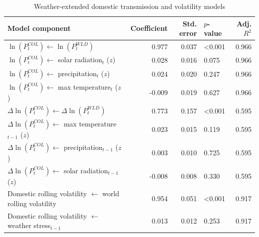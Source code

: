 \begin{table}
\caption{Weather-extended domestic transmission and volatility models}
\label{tab:weather_extended_models}
\begin{tabular}{lrrlr}
\toprule
Model component & Coefficient & Std. error & $p$-value & Adj. $R^2$ \\
\midrule
$\ln(P^{COL}_{t}) \leftarrow \ln(P^{WLD}_{t})$ & 0.977 & 0.037 & <0.001 & 0.966 \\
$\ln(P^{COL}_{t}) \leftarrow$ solar radiation$_t$ ($z$) & 0.028 & 0.016 & 0.075 & 0.966 \\
$\ln(P^{COL}_{t}) \leftarrow$ precipitation$_t$ ($z$) & 0.024 & 0.020 & 0.247 & 0.966 \\
$\ln(P^{COL}_{t}) \leftarrow$ max temperature$_t$ ($z$) & -0.009 & 0.019 & 0.627 & 0.966 \\
$\Delta \ln(P^{COL}_{t}) \leftarrow \Delta \ln(P^{WLD}_{t})$ & 0.773 & 0.157 & <0.001 & 0.595 \\
$\Delta \ln(P^{COL}_{t}) \leftarrow$ max temperature$_{t-1}$ ($z$) & 0.023 & 0.015 & 0.119 & 0.595 \\
$\Delta \ln(P^{COL}_{t}) \leftarrow$ precipitation$_{t-1}$ ($z$) & 0.003 & 0.010 & 0.725 & 0.595 \\
$\Delta \ln(P^{COL}_{t}) \leftarrow$ solar radiation$_{t-1}$ ($z$) & -0.008 & 0.008 & 0.330 & 0.595 \\
Domestic rolling volatility $\leftarrow$ world rolling volatility & 0.954 & 0.051 & <0.001 & 0.917 \\
Domestic rolling volatility $\leftarrow$ weather stress$_{t-1}$ & 0.013 & 0.012 & 0.253 & 0.917 \\
\bottomrule
\end{tabular}
\end{table}
